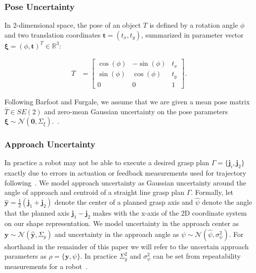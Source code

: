 \documentclass[10pt, conference]{ieeeconf}      %
\newcommand{\bj}{\mathbf{j}}
\newcommand{\bt}{\mathbf{t}}
\newcommand{\by}{\mathbf{y}}
\newcommand{\mN}{\mathcal{N}}
\begin{document}
\subsubsection{Pose Uncertainty}
In 2-dimensional space, the pose of an object $T$ is defined by a rotation angle $\phi$ and two translation coordinates $\bt = (t_x, t_y)$, summarized in parameter vector $\mathbf{\xi} = (\phi, \bt)^T \in \mathbb{R}^3$:

\vspace{-2ex}
\begin{align*}
	T &= \left[  \begin{array}{ccc}
		\cos(\phi) & -\sin(\phi) & t_x \\
		\sin(\phi) & \cos(\phi) & t_y \\
		0 & 0 & 1
		\end{array} \right] .
\end{align*}

\noindent Following Barfoot and Furgale, we assume that we are given a mean pose matrix $\bar{T} \in SE(2)$ and zero-mean Gaussian uncertainty on the pose parameters $\mathbf{\xi} \sim \mN \left( \mathbf{0}, \Sigma_{\xi} \right)$.~\cite{barfoot2014Pose}.

 
 \subsubsection{Approach Uncertainty}
In practice a robot may not be able to execute a desired grasp plan $\Gamma = \lbrace \bj_i,\bj_2\rbrace$ exactly due to errors in actuation or feedback measurements used for trajectory following~\cite{kehoe2012estimating}.
We model approach uncertainty as Gaussian uncertainty around the angle of approach and centroid of a straight line grasp plan $\Gamma$.
Formally, let $\hat{\by} = \frac{1}{2} (\bj_1 + \bj_2)$ denote the center of a planned grasp axis and $\hat{\psi}$ denote the angle that the planned axis $\bj_1 - \bj_2$ makes with the x-axis of the 2D coordinate system on our shape representation.
We model uncertainty in the approach center as $\by \sim \mN(\hat{\by}, \Sigma_y)$ and uncertainty in the approach angle as $\psi \sim \mN(\hat{\psi}, \sigma_{\psi}^2)$.
For shorthand in the remainder of this paper we will refer to the uncertain approach parameters as $\rho = \{\by, \psi \}$.
In practice $\Sigma_{y}^2$ and $\sigma_{\psi}^2$ can be set from repeatability measurements for a robot~\cite{mooring1986determination}.
\end{document}
